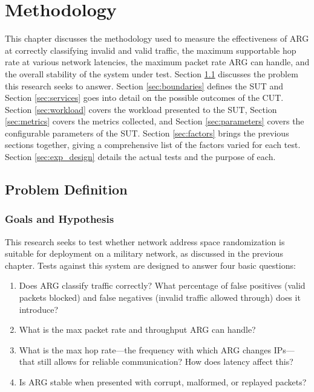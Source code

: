 \chapter{Methodology}
\label{chp:methodology}

\par This chapter discusses the methodology used to measure the effectiveness of \ac{ARG} at correctly classifying invalid and valid traffic, the maximum supportable hop rate at various network latencies, the maximum packet rate \ac{ARG} can handle, and the overall stability of the system under test. Section \ref{sec:problem_def} discusses the problem this research seeks to answer. Section \ref{sec:boundaries} defines the \ac{SUT} and Section \ref{sec:services} goes into detail on the possible outcomes of the \ac{CUT}. Section \ref{sec:workload} covers the workload presented to the \ac{SUT}, Section \ref{sec:metrics} covers the metrics collected, and Section \ref{sec:parameters} covers the configurable parameters of the \ac{SUT}. Section \ref{sec:factors} brings the previous sections together, giving a comprehensive list of the factors varied for each test. Section \ref{sec:exp_design} details the actual tests and the purpose of each.

\section{Problem Definition}
\label{sec:problem_def}
\subsection{Goals and Hypothesis}
\label{sec:goals}
\par This research seeks to test whether network address space randomization is suitable for deployment on a military network, as discussed in the previous chapter. Tests against this system are designed to answer four basic questions:

\begin{enumerate}
\item Does \ac{ARG} classify traffic correctly? What percentage of false positives (valid packets blocked) and false negatives (invalid traffic allowed through) does it introduce?
\item What is the max packet rate and throughput \ac{ARG} can handle?
\item What is the max hop rate---the frequency with which \ac{ARG} changes \acp{IP}---that still allows for reliable communication? How does latency affect this?
\item Is \ac{ARG} stable when presented with corrupt, malformed, or replayed packets?
\end{enumerate}

